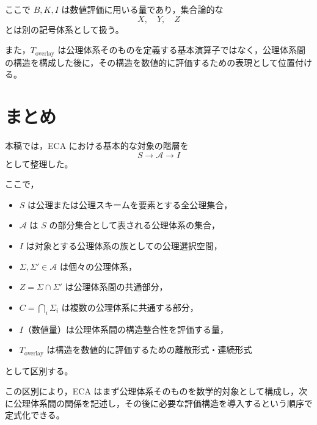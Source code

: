 \documentclass[a4paper,12pt]{article}
\begin{document}
ここで $B,K,I$ は数値評価に用いる量であり，集合論的な
\[
X,\quad Y,\quad Z
\]
とは別の記号体系として扱う。

また，$T_{\mathrm{overlay}}$ は公理体系そのものを定義する基本演算子ではなく，公理体系間の構造を構成した後に，その構造を数値的に評価するための表現として位置付ける。

\section{まとめ}

本稿では，ECA における基本的な対象の階層を
\[
S
\longrightarrow
\mathscr{A}
\longrightarrow
I
\]
として整理した。

ここで，

\begin{itemize}
  \item $S$ は公理または公理スキームを要素とする全公理集合，
  \item $\mathscr{A}$ は $S$ の部分集合として表される公理体系の集合，
  \item $I$ は対象とする公理体系の族としての公理選択空間，
  \item $\Sigma,\Sigma'\in\mathscr{A}$ は個々の公理体系，
  \item $Z=\Sigma\cap\Sigma'$ は公理体系間の共通部分，
  \item $C=\bigcap_i\Sigma_i$ は複数の公理体系に共通する部分，
  \item $I$（数値量）は公理体系間の構造整合性を評価する量，
  \item $T_{\mathrm{overlay}}$ は構造を数値的に評価するための離散形式・連続形式
\end{itemize}

として区別する。

この区別により，ECA はまず公理体系そのものを数学的対象として構成し，次に公理体系間の関係を記述し，その後に必要な評価構造を導入するという順序で定式化できる。
\end{document}
